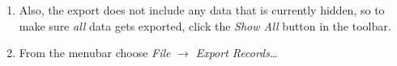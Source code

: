 \documentclass[12pt,a4paper]{scrartcl}
\begin{document}
\begin{enumerate}
    \newpage
  \item
    Also, the export does not include any data that is currently hidden, so to
    make sure \emph{all} data gets exported, click the \emph{Show All} button in
    the toolbar.\\[1ex]{}


  \item
    From the menubar choose \emph{File} $\to$ \emph{Export Records\dots}\\[1ex]{}


\end{enumerate}
\end{document}
